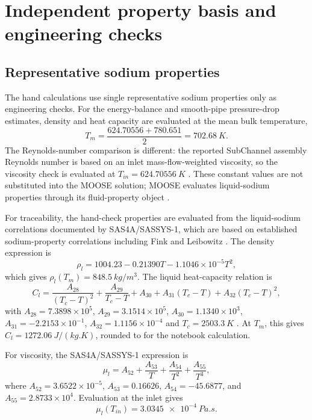 \documentclass[10pt,a4paper]{article}
\begin{document}
\section{Independent property basis and engineering checks}

\subsection{Representative sodium properties}
The hand calculations use single representative sodium properties only as engineering checks. For the energy-balance and smooth-pipe pressure-drop estimates, density and heat capacity are evaluated at the mean bulk temperature,
\begin{equation}
T_m=\frac{624.70556+780.651}{2}=\SI{702.68}{K}.
\end{equation}
The Reynolds-number comparison is different: the reported SubChannel assembly Reynolds number is based on an inlet mass-flow-weighted viscosity, so the viscosity check is evaluated at $T_{in}=\SI{624.70556}{K}$ \parencite{moose_subchannel_impl}. These constant values are not substituted into the MOOSE solution; MOOSE evaluates liquid-sodium properties through its fluid-property object \parencite{moose_pbsodium}.

For traceability, the hand-check properties are evaluated from the liquid-sodium correlations documented by SAS4A/SASSYS-1, which are based on established sodium-property correlations including Fink and Leibowitz \parencite{sas_sodium,fink1979}. The density expression is
\begin{equation}
\rho_l=1004.23-0.21390T-1.1046\times10^{-5}T^2,
\end{equation}
which gives $\rho_l(T_m)=\boxed{\SI{848.5}{kg/m^3}}$. The liquid heat-capacity relation is
\begin{equation}
C_l=\frac{A_{28}}{(T_c-T)^2}+\frac{A_{29}}{T_c-T}+A_{30}+A_{31}(T_c-T)+A_{32}(T_c-T)^2,
\end{equation}
with $A_{28}=7.3898\times10^5$, $A_{29}=3.1514\times10^5$, $A_{30}=1.1340\times10^3$, $A_{31}=-2.2153\times10^{-1}$, $A_{32}=1.1156\times10^{-4}$ and $T_c=\SI{2503.3}{K}$ \parencite{sas_sodium}. At $T_m$, this gives $C_l=\SI{1272.06}{J/(kg.K)}$, rounded to  for the notebook calculation.

For viscosity, the SAS4A/SASSYS-1 expression is \parencite{sas_sodium}
\begin{equation}
\mu_l=A_{52}+\frac{A_{53}}{T}+\frac{A_{54}}{T^2}+\frac{A_{55}}{T^3},
\end{equation}
where $A_{52}=3.6522\times10^{-5}$, $A_{53}=0.16626$, $A_{54}=-45.6877$, and $A_{55}=2.8733\times10^4$. Evaluation at the inlet gives
\begin{equation}
\mu_l(T_{in})=\boxed{\SI{3.0345e-4}{Pa.s}}.
\end{equation}
\end{document}
